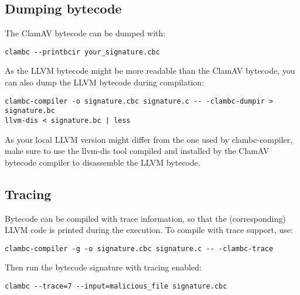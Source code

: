 \subsection{Dumping bytecode}
The ClamAV bytecode can be dumped with:
\begin{verbatim}
clambc --printbcir your_signature.cbc
\end{verbatim}

As the LLVM bytecode might be more readable than the ClamAV bytecode, you can
also dump the LLVM bytecode during compilation:
\begin{verbatim}
clambc-compiler -o signature.cbc signature.c -- -clambc-dumpir > signature.bc
llvm-dis < signature.bc | less
\end{verbatim}

As your local LLVM version might differ from the one used by clambc-compiler,
make sure to use the llvm-dis tool compiled and installed by the ClamAV
bytecode compiler to disassemble the LLVM bytecode.

\subsection{Tracing}
Bytecode can be compiled with trace information, so that the (corresponding)
LLVM code is printed during the execution. To compile with trace support, use:
\begin{verbatim}
clambc-compiler -g -o signature.cbc signature.c -- -clambc-trace
\end{verbatim}

Then run the bytecode signature with tracing enabled:
\begin{verbatim}
clambc --trace=7 --input=malicious_file signature.cbc
\end{verbatim}
